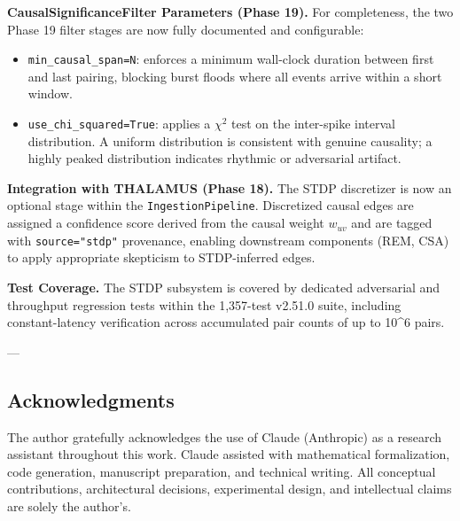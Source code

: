 \textbf{CausalSignif\-icanceFilter Parameters (Phase 19).} For compl\-eteness, the two Phase 19 filter stages are now fully documented and confi\-gurable:
\begin{itemize}
\item \texttt{min\_causal\_span=N}: enforces a minimum wall-clock duration between first and last pairing, blocking burst floods where all events arrive within a short window.
\item \texttt{use\_chi\_squared=True}: applies a $\chi^2$ test on the inter-spike interval distr\-ibution. A uniform distr\-ibution is consistent with genuine causality; a highly peaked distr\-ibution indicates rhythmic or adversarial artifact.

\end{itemize}
\textbf{Integration with THALAMUS (Phase 18).} The STDP discretizer is now an optional stage within the \texttt{IngestionPipeline}. Discretized causal edges are assigned a confidence score derived from the causal weight $w_{uv}$ and are tagged with \texttt{source="stdp"} provenance, enabling downstream components (REM, CSA) to apply appropriate skepticism to STDP-inferred edges.

\textbf{Test Coverage.} The STDP subsystem is covered by dedicated adversarial and throughput regression tests within the 1,357-test v2.51.0 suite, including constant-latency verif\-ication across accumulated pair counts of up to 10^6 pairs.

---
\subsection{Acknow\-ledgments}

The author gratefully ackno\-wledges the use of Claude (Anthropic) as a research assistant throughout this work. Claude assisted with mathe\-matical forma\-lization, code generation, manuscript preparation, and technical writing. All conceptual contr\-ibutions, archi\-tectural decisions, exper\-imental design, and intel\-lectual claims are solely the author's.

